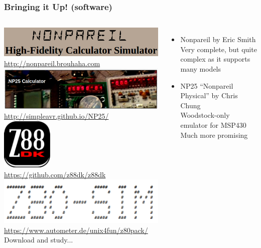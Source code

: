 \documentclass{beamer}
\newcommand{\tgreen}[1]{\textcolor{my-green}{#1}}
\begin{document}
\begin{frame}
  \frametitle{Bringing it Up!  (software)}
  \begin{columns}
    \scriptsize
    \includegraphics[width=\textwidth]{figs/nonpareil.png} \\
    \url{http://nonpareil.brouhaha.com} \\
    \vskip 0.1in
    \includegraphics[width=\textwidth]{figs/np25.png} \\
    \url{http://simpleavr.github.io/NP25/} \\
    \vskip 0.1in
    \includegraphics[width=0.3\textwidth]{figs/z88dk.png} \\
    \url{https://github.com/z88dk/z88dk}
    \vskip 0.1in
    \includegraphics[width=\textwidth]{figs/z80-sim.png} \\
    \url{https://www.autometer.de/unix4fun/z80pack/}
    \tgreen{Download and study...}
      \begin{itemize}
      \scriptsize
      \item Nonpareil by Eric Smith \\
        Very complete, but quite complex as it supports
        many models
      \item NP25 ``Nonpareil Physical'' by Chris Chung \\
        Woodstock-only emulator for MSP430 \\
        Much more promising
      \end{itemize}
    \scriptsize


\end{columns}
\end{frame}
\end{document}
